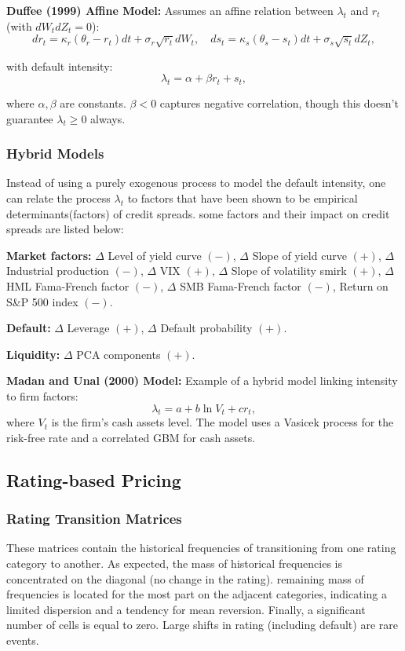 \documentclass[12pt,a4paper]{article}
\begin{document}
\textbf{Duffee (1999) Affine Model:} Assumes an affine relation between $\lambda_t$ and $r_t$ (with $dW_t dZ_t = 0$):
$$dr_t = \kappa_r(\theta_r - r_t)dt + \sigma_r\sqrt{r_t}dW_t, \quad ds_t = \kappa_s(\theta_s - s_t)dt + \sigma_s\sqrt{s_t}dZ_t,$$

with default intensity:
$$\lambda_t = \alpha + \beta r_t + s_t,$$

where $\alpha, \beta$ are constants. $\beta < 0$ captures negative correlation, though this doesn't guarantee $\lambda_t \geq 0$ always.

\subsubsection{Hybrid Models }
Instead of using a purely exogenous process to model the default intensity, one can relate the 
process $\lambda_t$ to factors that have been shown to be empirical determinants(factors) of credit spreads. some factors and their impact on credit spreads are listed below:

\noindent\textbf{Market factors:} $\Delta$ Level of yield curve $(-)$, $\Delta$ Slope of yield curve $(+)$, $\Delta$ Industrial production $(-)$, $\Delta$ VIX $(+)$, $\Delta$ Slope of volatility smirk $(+)$, $\Delta$ HML Fama-French factor $(-)$, $\Delta$ SMB Fama-French factor $(-)$, Return on S\&P 500 index $(-)$.

\noindent\textbf{Default:} $\Delta$ Leverage $(+)$, $\Delta$ Default probability $(+)$.

\noindent\textbf{Liquidity:} $\Delta$ PCA components $(+)$.

\textbf{Madan and Unal (2000) Model:} Example of a hybrid model linking intensity to firm factors:
$$\lambda_t = a + b\ln V_t + cr_t,$$
where $V_t$ is the firm's cash assets level. The model uses a Vasicek process for the risk-free rate and a correlated GBM for cash assets.


\subsection{Rating-based Pricing  }
\subsubsection{Rating Transition Matrices}
These matrices contain the historical frequencies of transitioning from one rating 
category to another. As expected, the mass of historical frequencies is concentrated on the diagonal (no change in the 
rating). remaining mass of frequencies is located for the most part on the 
adjacent categories, indicating a limited dispersion and a tendency for mean reversion. Finally, a 
significant number of cells is equal to zero. Large shifts in rating (including default) are rare events.
\end{document}
